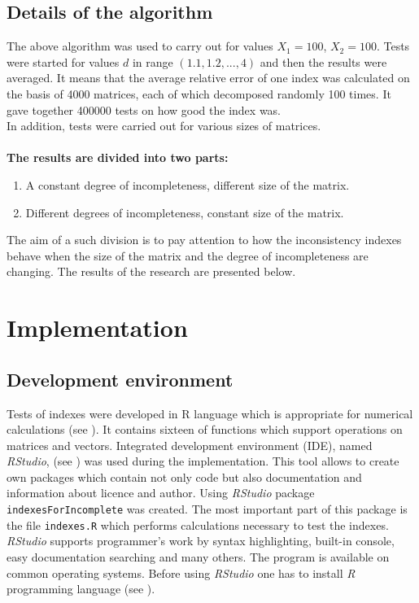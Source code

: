 \subsection{Details of the algorithm}
\label{sec:details}
The above algorithm was used to carry out for values $X_{1}=100$, $X_{2}=100$. Tests were started for values $d$ in range $\left(1.1,1.2,...,4\right)$ and then the results were averaged. It means that the average relative error of one index was calculated on the basis of 4000 matrices, each of which decomposed randomly 100 times. It gave together 400000 tests on how good the index was. 
\\
In addition, tests were carried out for various sizes of matrices.
\\
\\
\textbf{The results are divided into two parts:}
\begin{enumerate}
  \item A constant degree of incompleteness, different size of the matrix.
  \item Different degrees of incompleteness, constant size of the matrix.
\end{enumerate}

The aim of a such division is to pay attention to how the inconsistency indexes behave when the size of the matrix and the degree of incompleteness are changing. The results of the research are presented below.


\section{Implementation}

\subsection{Development environment}
Tests of indexes were developed in R language which is appropriate for numerical calculations (see \cite{projectR}). It contains sixteen of functions which support operations on matrices and vectors. Integrated development environment (IDE), named \textit{RStudio}, (see \cite{studioR}) was used during the implementation. This tool allows to create own packages which contain not only code but also documentation and information about licence and author. Using \textit{RStudio} package \texttt{indexesForIncomplete} was created. The most important part of this package is the file \texttt{indexes.R} which performs calculations necessary to test the indexes. \textit{RStudio} supports programmer's work by syntax highlighting, built-in console, easy documentation searching and many others. The program is available on common operating systems. Before using \textit{RStudio} one has to install \textit{R} programming language (see \cite{installR}).  



